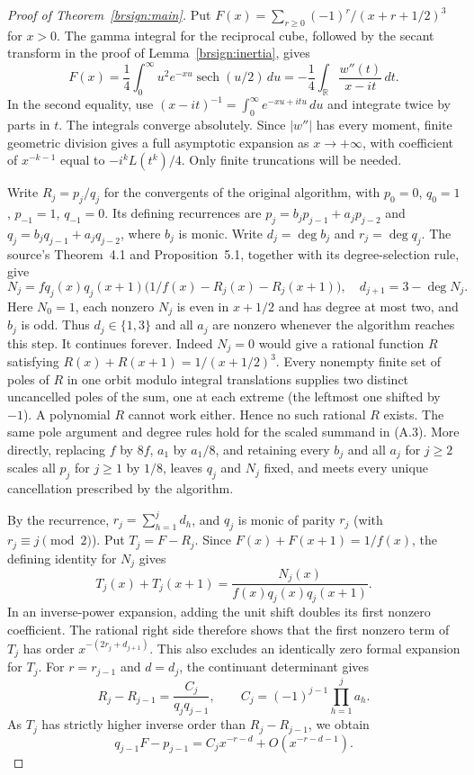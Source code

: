 \documentclass[11pt,a4paper]{article}
\theoremstyle{definition}
\theoremstyle{remark}
\numberwithin{equation}{section}
\begin{document}
\begin{proof}[Proof of Theorem~\ref{brsign:main}]
Put $F(x)=\sum_{r\ge0}(-1)^r/(x+r+1/2)^3$ for $x>0$. The gamma integral
for the reciprocal cube, followed by the secant transform in the proof
of Lemma~\ref{brsign:inertia}, gives
\begin{equation}\label{brsign:cauchy}
 F(x)=\frac14\int_0^\infty u^2 e^{-xu}\operatorname{sech}(u/2)\,du
     =-\frac14\int_{\mathbb R}\frac{w''(t)}{x-it}\,dt.
\end{equation}
In the second equality, use $(x-it)^{-1}=\int_0^\infty e^{-xu+itu}\,du$
and integrate twice by parts in $t$. The integrals converge absolutely.
Since $|w''|$ has every moment, finite geometric division gives a full
asymptotic expansion as $x\to+\infty$, with coefficient of $x^{-k-1}$
equal to $-i^k L(t^k)/4$. Only finite truncations will be needed.

Write $R_j=p_j/q_j$ for the convergents of the original algorithm, with
$p_0=0$, $q_0=1$, $p_{-1}=1$, $q_{-1}=0$. Its defining recurrences are
$p_j=b_jp_{j-1}+a_jp_{j-2}$ and $q_j=b_jq_{j-1}+a_jq_{j-2}$, where
$b_j$ is monic. Write $d_j=\deg b_j$ and $r_j=\deg q_j$. The source's
Theorem~4.1 and Proposition~5.1, together with its degree-selection rule,
give
\[
 N_j=fq_j(x)q_j(x+1)\bigl(1/f(x)-R_j(x)-R_j(x+1)\bigr),
 \quad d_{j+1}=3-\deg N_j.
\]
Here $N_0=1$, each nonzero $N_j$ is even in $x+1/2$ and has degree at
most two, and $b_j$ is odd. Thus $d_j\in\{1,3\}$ and all $a_j$ are
nonzero whenever the algorithm reaches this step. It continues forever.
Indeed $N_j=0$ would give a rational function $R$ satisfying
$R(x)+R(x+1)=1/(x+1/2)^3$. Every nonempty finite set of poles of $R$ in
one orbit modulo integral translations supplies two distinct uncancelled
poles of the sum, one at each extreme (the leftmost one shifted by $-1$).
A polynomial $R$ cannot work either. Hence no such rational $R$ exists.
The same pole argument and degree rules hold for the scaled summand in
(A.3). More directly, replacing $f$ by $8f$, $a_1$ by $a_1/8$,
and retaining every $b_j$ and all $a_j$ for $j\ge2$ scales all $p_j$
for $j\ge1$ by $1/8$, leaves $q_j$ and $N_j$ fixed, and meets every
unique cancellation prescribed by the algorithm.

By the recurrence, $r_j=\sum_{h=1}^j d_h$, and $q_j$ is monic of parity
$r_j$ (with $r_j\equiv j\pmod2$). Put $T_j=F-R_j$. Since
$F(x)+F(x+1)=1/f(x)$, the defining identity for $N_j$ gives
\[
 T_j(x)+T_j(x+1)=\frac{N_j(x)}{f(x)q_j(x)q_j(x+1)}.
\]
In an inverse-power expansion, adding the unit shift doubles its first
nonzero coefficient. The rational right side therefore shows
that the first nonzero term of $T_j$ has order $x^{-(2r_j+d_{j+1})}$.
This also excludes an identically zero formal expansion for $T_j$.
For $r=r_{j-1}$ and $d=d_j$, the continuant determinant gives
\[
 R_j-R_{j-1}=\frac{C_j}{q_jq_{j-1}},
 \qquad C_j=(-1)^{j-1}\prod_{h=1}^j a_h.
\]
As $T_j$ has strictly higher inverse order than $R_j-R_{j-1}$, we obtain
\begin{equation}\label{brsign:pivotres}
 q_{j-1}F-p_{j-1}= C_j x^{-r-d}+O(x^{-r-d-1}).
\end{equation}


\end{proof}
\end{document}
